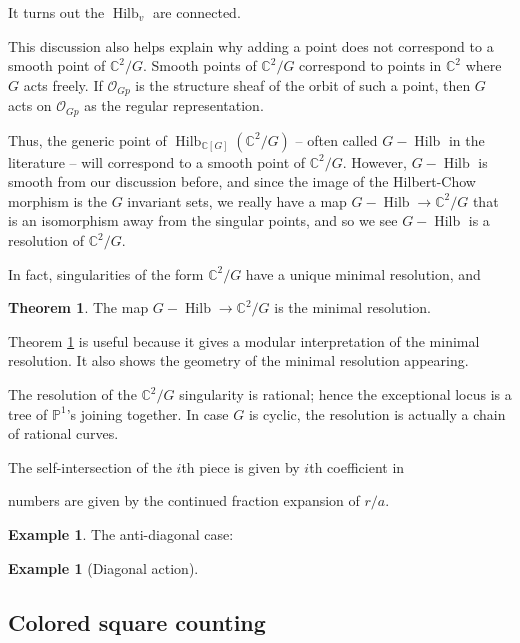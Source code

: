 \documentclass{amsart}[12pt]
\theoremstyle{definition}
\newtheorem{theorem}[dummy]{Theorem}
\newtheorem{example}[dummy]{Example}
\newcommand{\C}{\mathbb{C}}
\newcommand{\proj}{\mathbb{P}}
\DeclareMathOperator{\Hilb}{Hilb}
\begin{document}
It turns out the $\Hilb_v$ are connected.  

This discussion also helps explain why adding a point does not correspond to a smooth point of $\C^2/G$.  Smooth points of $\C^2/G$ correspond to points in $\C^2$ where $G$ acts freely.  If $\mathcal{O}_{Gp}$ is the structure sheaf of the orbit of such a point, then $G$ acts on $\mathcal{O}_{Gp}$ as the regular representation.  

Thus, the generic point of $\Hilb_{\C[G]}({\C^2/G})$ -- often called $G-\Hilb$ in the literature -- will correspond to a smooth point of $\C^2/G$.  However, $G-\Hilb$ is smooth from our discussion before, and since the image of the Hilbert-Chow morphism is the $G$ invariant sets, we really have a map $G-\Hilb\to \C^2/G$ that is an isomorphism away from the singular points, and so we see $G-\Hilb$ is a resolution of $\C^2/G$. 

In fact, singularities of the form $\C^2/G$ have a unique minimal resolution, and 

\begin{theorem} \label{thm:GHilb-resolution}
The map $G-\Hilb\to \C^2/G$ is the minimal resolution.
\end{theorem}

Theorem \ref{thm:GHilb-resolution} is useful because it gives a modular interpretation of the minimal resolution.  It also shows the geometry of the minimal resolution appearing.

The resolution of the $\C^2/G$ singularity is rational; hence the exceptional locus is a tree of $\proj^1$'s joining together.  In case $G$ is cyclic, the resolution is actually a chain of rational curves.  

The self-intersection of the $i$th piece is given by $i$th coefficient in 

numbers are given by the continued fraction expansion of $r/a$.  

\begin{example}
The anti-diagonal case:



\end{example}

\begin{example}[Diagonal action]

\end{example}


\subsection{Colored square counting}
\end{document}
